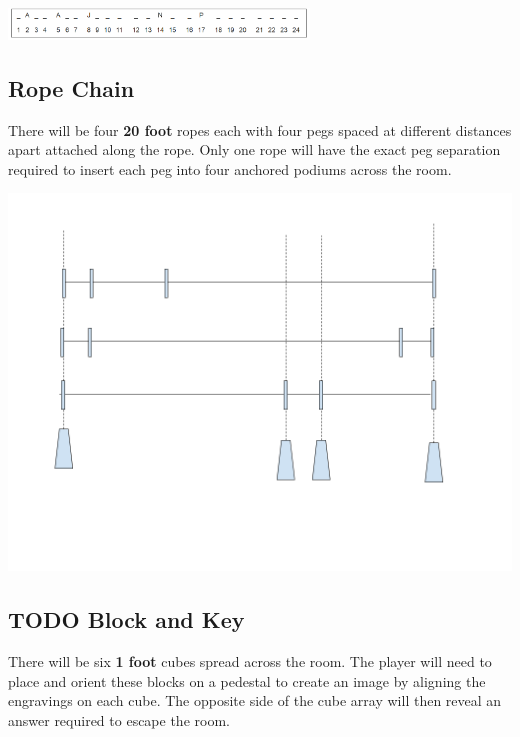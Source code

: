 \documentclass[11pt]{article}
\begin{document}
\begin{center}
\includegraphics[width=8cm]{./img/acrostic-3.png}
\end{center}

\subsection{Rope Chain}
\label{sec:orga099935}
There will be four \textbf{20 foot} ropes each with four pegs spaced at different distances apart attached along the rope. Only one rope will have the exact peg separation required to insert each peg into four anchored podiums across the room.

\begin{center}
\includegraphics[width=.9\linewidth]{./img/pt-rc-001.png}
\end{center}

\subsection{{\bfseries\sffamily TODO} Block and Key}
\label{sec:org177685a}
There will be six \textbf{1 foot} cubes spread across the room. The player will need to place and orient these blocks on a pedestal to create an image by aligning the engravings on each cube. The opposite side of the cube array will then reveal an answer required to escape the room.
\end{document}

